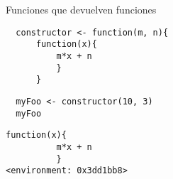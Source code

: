 \documentclass[xcolor={usenames,svgnames,dvipsnames}]{beamer}
\begin{document}
\begin{frame}[fragile,label={sec:orgheadline17}]{Funciones que devuelven funciones}
 \lstset{language=R,label= ,caption= ,captionpos=b,numbers=none}
\begin{lstlisting}
  constructor <- function(m, n){
      function(x){
          m*x + n
          }
      }
\end{lstlisting}

\lstset{language=R,label= ,caption= ,captionpos=b,numbers=none}
\begin{lstlisting}
  myFoo <- constructor(10, 3)
  myFoo
\end{lstlisting}

\begin{verbatim}
function(x){
          m*x + n
          }
<environment: 0x3dd1bb8>
\end{verbatim}
\end{frame}
\end{document}
